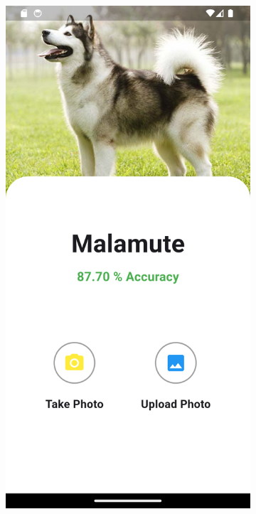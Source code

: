 \begin{figure}[H]
  \centering
  \begin{subfigure}{0.47\textwidth}
    \includegraphics[width=\linewidth]{img/dog5.png}

\end{subfigure}
\end{figure}
